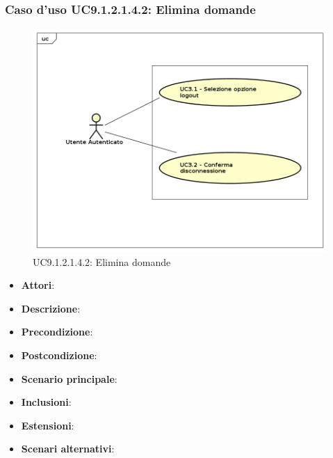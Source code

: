 						\subsubsection{Caso d'uso UC9.1.2.1.4.2: Elimina domande}
						\label{UC9.1.2.1.4.2}
						\begin{figure}[h]
							\centering
						\includegraphics[scale=0.7,keepaspectratio]{UML/UC9.png}
							\caption{UC9.1.2.1.4.2: Elimina domande}
						\end{figure}
						\FloatBarrier
						\begin{itemize}
							\item \textbf{Attori}: 
							\item \textbf{Descrizione}: 
							\item \textbf{Precondizione}: 
							\item \textbf{Postcondizione}: 
							\item \textbf{Scenario principale}:
							\item \textbf{Inclusioni}:
							\item \textbf{Estensioni}:
							\item \textbf{Scenari alternativi}:
						\end{itemize}
						
